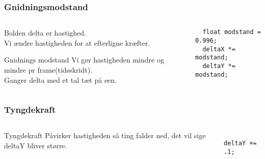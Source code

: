 \documentclass{beamer}
\begin{document}
\begin{frame}[fragile]
  \frametitle{Gnidningsmodstand}

  \begin{columns}
    \begin{column}{0.5\textwidth}
      \begin{block}{Bolden}
        delta er hastighed. \\

        Vi ændre hastigheden for at efterligne kræfter.
      \end{block}


      \begin{block}{Gnidnings modstand}
        Vi gør hastigheden mindre og mindre pr frame(tidsskridt).\\
        Ganger delta med et tal tæt på een.
      \end{block}

    \end{column}
    \begin{column}{0.5\textwidth}
\begin{verbatim} 
  float modstand = 0.996;
  deltaX *= modstand;
  deltaY *= modstand;

\end{verbatim}
    \end{column}
  \end{columns}
\end{frame}

\begin{frame}[fragile]
  \frametitle{Tyngdekraft}
  
  \begin{columns}
    \begin{column}{0.5\textwidth}
      
      \begin{block}{Tyngdekraft}
        Påvirker hastigheden så ting falder ned, det vil sige deltaY bliver større.
      \end{block}
      
    \end{column}
    \begin{column}{0.5\textwidth}
\begin{verbatim} 

deltaY += .1;

\end{verbatim}
    \end{column}
  \end{columns}
\end{frame}
\end{document}
